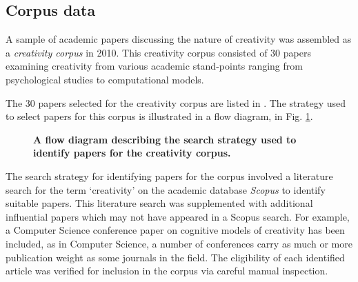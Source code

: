 \documentclass[10pt,letterpaper]{article}
\begin{document}
\subsection*{Corpus data}\label{corpusData}

A sample of academic papers discussing the nature of creativity was assembled as a {\em creativity corpus\/} in 2010. This creativity corpus consisted of 30 papers examining creativity from various academic stand-points ranging from psychological studies to computational models. 

\vspace{0.25cm}
\begin{center}
\end{center}
\vspace{0.25cm}

The 30 papers selected for the creativity corpus are listed in . The strategy used to select papers for this corpus is illustrated in a flow diagram, in Fig. \ref{searchCC}. 

\begin{figure}[!b]
\caption{{\bf A flow diagram describing the search strategy used to identify papers for the creativity corpus.}}
\label{searchCC}
\end{figure} 

The search strategy for identifying papers for the corpus involved a literature search for the term `creativity' on the academic database {\em Scopus} to identify suitable papers. This literature search was supplemented with additional influential papers which may not have appeared in a Scopus search. For example, a Computer Science conference paper on cognitive models of creativity has been included, as in Computer Science, a number of conferences carry as much or more publication weight as some journals in the field. The eligibility of each identified article was verified for inclusion in the corpus via careful manual inspection.
\end{document}
